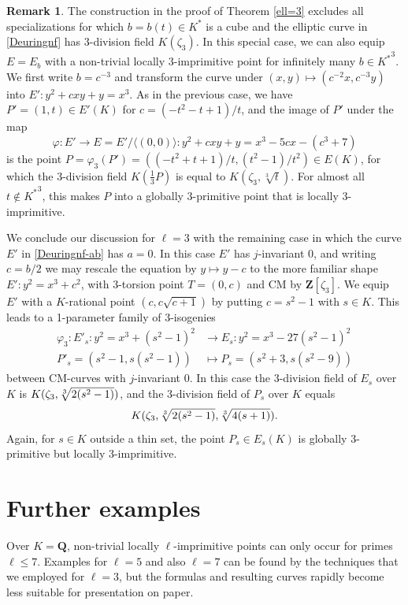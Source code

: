 \documentclass{amsart}
\theoremstyle{plain}
\theoremstyle{definition}
\newtheorem{remark}[theorem]{Remark}
\newcommand{\Que}{{\mathbf{Q}}}
\newcommand{\Zee}{{\mathbf{Z}}}
\newcommand{\tto}{\longrightarrow}
\begin{document}
\begin{remark}
The construction in the proof of Theorem \ref{ell=3} excludes all specializations for which $b=b(t)\in K^*$ is a cube and 
the elliptic curve in \eqref{Deuringnf} has 3-division field $K(\zeta_3)$.
In this special case, we can also equip $E=E_b$  
with a non-trivial locally 3-imprimitive point
for infinitely many $b\in {K^*}^3$.
We first write $b=c^{-3}$ and transform the curve under
$(x,y)\mapsto (c^{-2}x, c^{-3}y)$ into $E':y^2+cxy+y=x^3$.
As in the previous case, we have $P'=(1,t)\in E'(K)$ 
for $c=(-t^2-t+1)/t$, and the image of $P'$ under the map 
\[
\varphi: E'\to E= E'/\langle(0,0)\rangle: y^2+cxy+y=x^3-5cx-(c^3+7)
\]
is the point $P=\varphi_3(P')=((-t^2 + t + 1)/t, (t^2 - 1)/t^2)\in E(K)$,
for which the 3-division field $K(\frac13P)$ is equal to  
$K(\zeta_3,\sqrt[3]t)$.
For almost all $t\notin {K^*}^3$, this makes $P$ into a 
globally 3-primitive point that is locally $3$-imprimitive. 
\end{remark}
\noindent
We conclude our discussion for $\ell=3$ with the remaining case in which
the curve $E'$ in \eqref{Deuringnf-ab} has $a=0$.
In this case $E'$ has $j$-invariant 0, and writing $c=b/2$
we may rescale the equation by $y\mapsto y-c$ to the more 
familiar shape $E': y^2=x^3+c^2$, 
with 3-torsion point $T=(0,c)$ and CM by $\Zee[\zeta_3]$.
We equip $E'$ with a $K$-rational point $(c, c\sqrt{c+1})$
by putting $c=s^2-1$ with $s\in K$.
This leads to a 1-parameter family of 3-isogenies 
\begin{align*}
    \varphi_3: E'_s: y^2= x^3 + (s^2-1)^2 &\tto  E_s: y^2= x^3 - 27 (s^2-1)^2 \\
    P'_s=(s^2-1, s(s^2-1))&\longmapsto P_s=(s^2+3, s(s^2-9))
\end{align*}
between CM-curves with $j$-invariant 0.
In this case the 3-division field of $E_s$ over~$K$ is 
$K(\zeta_3, \root 3 \of {2(s^2-1)})$, and the 3-division field of $P_s$ over $K$ equals
\[
K(\zeta_3, \root 3 \of {2(s^2-1)}, \root 3 \of {4(s+1)}).
\]
Again, for $s\in K$ outside a thin set, the point $P_s\in E_s(K)$
is globally 3-primitive but locally 3-imprimitive.
\section{Further examples}
\label{S:Further examples}

\noindent
Over $K=\Que$, non-trivial locally $\ell$-imprimitive points 
can only occur for primes $\ell\le 7$.
Examples for $\ell=5$ and also $\ell=7$
can be found by the techniques that we employed for $\ell=3$, but the 
formulas and resulting curves rapidly become less suitable for presentation on paper.
\end{document}
